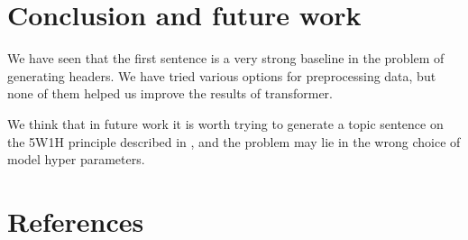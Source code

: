 \documentclass{dialogue}
\begin{document}
\section{Conclusion and future work}
We have seen that the first sentence is a very strong baseline in the problem of generating headers. We have tried various options for preprocessing data, but none of them helped us improve the results of transformer.

We think that in future work it is worth trying to generate a topic sentence on the 5W1H principle described in \cite{Putra2018IncorporatingTS}, and the problem may lie in the wrong choice of model hyper parameters.


\color{blue}\section*{References}

\makeatletter
\renewcommand{\section}{\@gobbletwo}
\makeatother

\end{document}
